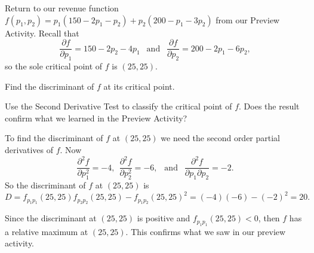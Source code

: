 \begin{activity} \label{A:10.7.4} Return to our revenue function $f(p_1,p_2) = p_1(150 - 2p_1 - p_2) + p_2(200 - p_1 - 3p_2)$ from our Preview Activity. Recall that
\[\frac{\partial f}{\partial p_1} = 150 - 2p_2 - 4p_1 \ \ \text{ and } \ \ \frac{\partial f}{\partial p_2} = 200 - 2p_1 - 6p_2,\]
so the sole critical point of $f$ is $(25,25)$.
	\ba
	\item Find the discriminant of $f$ at its critical point.
	
	
	
	\item Use the Second Derivative Test to classify the critical point of $f$. Does the result confirm what we learned in the Preview Activity?
	
	
	
	\ea
\end{activity}
\begin{smallhint}

\end{smallhint}
\begin{bighint}

\end{bighint}
\begin{activitySolution}
\ba
\item To find the discriminant of $f$ at $(25,25)$ we need the second order partial derivatives of $f$. Now
\[\frac{\partial^2 f}{\partial p_1^2} = -4, \ \  \frac{\partial^2 f}{\partial p_2^2} = -6, \ \ \text{ and } \ \ \frac{\partial^2 f}{\partial p_1 \partial p_2} = -2.\]
So the discriminant of $f$ at $(25,25)$ is
\[D = f_{p_1p_1}(25, 25) f_{p_2p_2}(25, 25) - f_{p_1p_2}(25, 25)^2 = (-4)(-6) - (-2)^2 = 20.\]

\item Since the discriminant at $(25,25)$ is positive and $f_{p_1p_1}(25, 25) < 0$, then $f$ has a relative maximum at $(25, 25)$. This confirms what we saw in our preview activity. 
\ea 
\end{activitySolution}
\aftera
